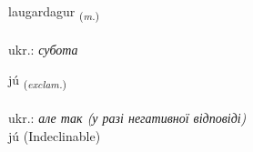 \documentclass[frontgrid, backgrid]{flacards}\usepackage[]{graphicx}\usepackage[]{xcolor}
\begin{document}
\renewcommand{\flhead}{\vskip5pt \fboxsep=0pt {\small\bfseries\footnotesize Nafnorð | іменник}}
\renewcommand{\fcfoot}{\vskip5pt \fboxsep=0pt \hspace{2pt}{\small\bfseries\footnotesize 1K}}

\renewcommand{\blhead}{\vskip5pt {\small\bfseries\footnotesize Nafnorð | іменник }}
\renewcommand{\bcfoot}{\vskip5pt \hspace{2pt}{\small\bfseries\footnotesize 1K}}


{laugardagur \small{\textsubscript{(\textit{m.})}} \\[1ex] %
\textphonetic{[lœiːɣartaɣʏr]} \\
ukr.: \emph{субота} \\  [2ex]
\renewcommand*{\arraystretch}{0.8}
}


\renewcommand{\flhead}{\vskip5pt \fboxsep=0pt {\small\bfseries\footnotesize Upphrópanir | вигук}}
\renewcommand{\fcfoot}{\vskip5pt \fboxsep=0pt \hspace{2pt}{\small\bfseries\footnotesize 1K}}

\renewcommand{\blhead}{\vskip5pt {\small\bfseries\footnotesize Upphrópanir | вигук }}
\renewcommand{\bcfoot}{\vskip5pt \hspace{2pt}{\small\bfseries\footnotesize 1K}}


{jú \small{\textsubscript{(\textit{exclam.})}} \\[1ex]
\textphonetic{[juː]} \\
ukr.: \emph{але так (у разі негативної відповіді)} \\  [2ex]
jú (Indeclinable)}

\renewcommand{\flhead}{\vskip5pt \fboxsep=0pt {\small\bfseries\footnotesize Sagnorð | дієслово}}
\renewcommand{\fcfoot}{\vskip5pt \fboxsep=0pt \hspace{2pt}{\small\bfseries\footnotesize 1K}}
\end{document}
